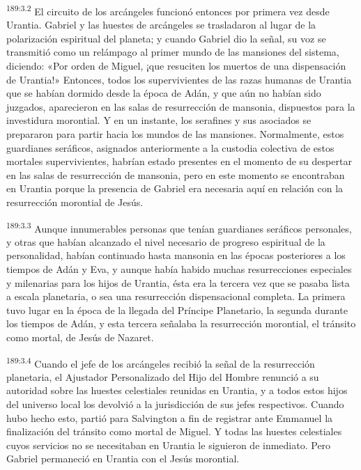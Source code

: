 \par
\textsuperscript{189:3.2} El circuito de los arcángeles funcionó entonces por primera vez desde Urantia. Gabriel y las huestes de arcángeles se trasladaron al lugar de la polarización espiritual del planeta; y cuando Gabriel dio la señal, su voz se transmitió como un relámpago al primer mundo de las mansiones del sistema, diciendo: «Por orden de Miguel, ¡que resuciten los muertos de una dispensación de Urantia!» Entonces, todos los supervivientes de las razas humanas de Urantia que se habían dormido desde la época de Adán, y que aún no habían sido juzgados, aparecieron en las salas de resurrección de mansonia, dispuestos para la investidura morontial. Y en un instante, los serafines y sus asociados se prepararon para partir hacia los mundos de las mansiones. Normalmente, estos guardianes seráficos, asignados anteriormente a la custodia colectiva de estos mortales supervivientes, habrían estado presentes en el momento de su despertar en las salas de resurrección de mansonia, pero en este momento se encontraban en Urantia porque la presencia de Gabriel era necesaria aquí en relación con la resurrección morontial de Jesús.

\par
\textsuperscript{189:3.3} Aunque innumerables personas que tenían guardianes seráficos personales, y otras que habían alcanzado el nivel necesario de progreso espiritual de la personalidad, habían continuado hasta mansonia en las épocas posteriores a los tiempos de Adán y Eva, y aunque había habido muchas resurrecciones especiales y milenarias para los hijos de Urantia, ésta era la tercera vez que se pasaba lista a escala planetaria, o sea una resurrección dispensacional completa. La primera tuvo lugar en la época de la llegada del Príncipe Planetario, la segunda durante los tiempos de Adán, y esta tercera señalaba la resurrección morontial, el tránsito como mortal, de Jesús de Nazaret.

\par
\textsuperscript{189:3.4} Cuando el jefe de los arcángeles recibió la señal de la resurrección planetaria, el Ajustador Personalizado del Hijo del Hombre renunció a su autoridad sobre las huestes celestiales reunidas en Urantia, y a todos estos hijos del universo local los devolvió a la jurisdicción de sus jefes respectivos. Cuando hubo hecho esto, partió para Salvington a fin de registrar ante Emmanuel la finalización del tránsito como mortal de Miguel. Y todas las huestes celestiales cuyos servicios no se necesitaban en Urantia le siguieron de inmediato. Pero Gabriel permaneció en Urantia con el Jesús morontial.

